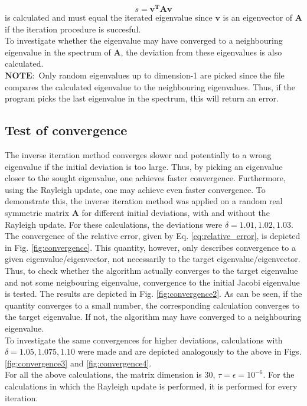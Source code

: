 \documentclass{article}
\begin{document}
	\begin{equation}
		s = \mathbf{v^{T}Av}
	\end{equation}
	is calculated and must equal the iterated eigenvalue since $\mathbf{v}$ is an eigenvector of $\mathbf{A}$ if the iteration procedure is succesful.\\
	To investigate whether the eigenvalue may have converged to a neighbouring eigenvalue in the spectrum of $\mathbf{A}$, the deviation from these eigenvalues is also calculated.\\ $\mathbf{NOTE:}$ Only random eigenvalues up to dimension-1 are picked since the file compares the calculated eigenvalue to the neighbouring eigenvalues. Thus, if the program picks the last eigenvalue in the spectrum, this will return an error.
	\subsection*{Test of convergence}
	The inverse iteration method converges slower and potentially to a wrong eigenvalue if the initial deviation is too large. Thus, by picking an eigenvalue closer to the sought eigenvalue, one achieves faster convergence. Furthermore, using the Rayleigh update, one may achieve even faster convergence. To demonstrate this, the inverse iteration method was applied on a random real symmetric matrix $\mathbf{A}$ for different initial deviations, with and without the Rayleigh update. For these calculations, the deviations were $\delta=1.01,1.02,1.03$. The convergence of the relative error, given by Eq. \ref{eq:relative_error}, is depicted in Fig. \ref{fig:convergence}. This quantity, however, only describes convergence to a given eigenvalue/eigenvector, not necessarily to the target eigenvalue/eigenvector. Thus, to check whether the algorithm actually converges to the target eigenvalue and not some neigbouring eigenvalue, convergence to the initial Jacobi eigenvalue is tested. The results are depicted in Fig. \ref{fig:convergence2}. As can be seen, if the quantity converges to a small number, the corresponding calculation converges to the target eigenvalue. If not, the algorithm may have converged to a neighbouring eigenvalue.\\
	To investigate the same convergences for higher deviations, calculations with $\delta=1.05,1.075,1.10$ were made and are depicted analogously to the above in Figs. \ref{fig:convergence3} and \ref{fig:convergence4}.\\
	For all the above calculations, the matrix dimension is 30, $\tau=\epsilon=10^{-6}$. For the calculations in which the Rayleigh update is performed, it is performed for every iteration.
\end{document}
